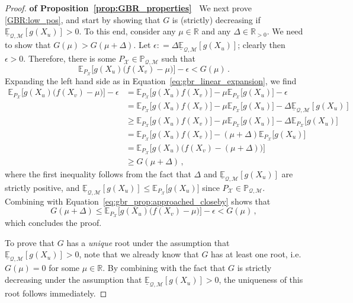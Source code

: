 \documentclass[twoside,11pt]{article}
\newcommand{\reals}{\mathbb{R}}
\newcommand{\realspos}{\reals_{>0}}
\newcommand{\states}{\mathcal{X}}
\newcommand{\lexp}{\underline{\mathbb{E}}_{\rateset,\mathcal{M}}}
\newcommand{\rateset}{\mathcal{Q}}
\newcommand{\coloneqq}{:\!=}
\begin{document}
\begin{proof}{\bf of Proposition~\ref{prop:GBR_properties}~}
We next prove \ref{GBR:low_pos}, and start by showing that $G$ is (strictly) decreasing if $\lexp[g(X_u)]>0$. To this end, consider any $\mu\in\reals$ and any $\Delta\in\realspos$. We need to show that $G(\mu)>G(\mu+\Delta)$. Let $\epsilon\coloneqq \Delta \lexp[g(X_u)]$; clearly then $\epsilon>0$. Therefore, there is some $P_\states\in\mathbb{P}_{\rateset,\mathcal{M}}$ such that
\begin{equation}\label{eq:gbr_prop:approached_closeby}
\mathbb{E}_{P_\states}\bigl[g(X_u)\bigl(f(X_v)-\mu\bigr)\bigr] - \epsilon < G(\mu)\,.
\end{equation}
Expanding the left hand side as in Equation~\eqref{eq:gbr_linear_expansion}, we find
\begin{align*}
\mathbb{E}_{P_\states}\bigl[g(X_u)\bigl(f(X_v)-\mu\bigr)\bigr] - \epsilon &= \mathbb{E}_{P_\states}\bigl[g(X_u)f(X_v)\bigr] - \mu \mathbb{E}_{P_\states}\bigl[g(X_u)\bigr] - \epsilon \\
 &= \mathbb{E}_{P_\states}\bigl[g(X_u)f(X_v)\bigr] - \mu \mathbb{E}_{P_\states}\bigl[g(X_u)\bigr] - \Delta\lexp[g(X_u)] \\
 &\geq \mathbb{E}_{P_\states}\bigl[g(X_u)f(X_v)\bigr] - \mu \mathbb{E}_{P_\states}\bigl[g(X_u)\bigr] - \Delta\mathbb{E}_{P_\states}\bigl[g(X_u)\bigr] \\
 &= \mathbb{E}_{P_\states}\bigl[g(X_u)f(X_v)\bigr] - (\mu+\Delta) \mathbb{E}_{P_\states}\bigl[g(X_u)\bigr] \\
 &= \mathbb{E}_{P_\states}\bigl[g(X_u)\bigl(f(X_v)-(\mu+\Delta)\bigr)\bigr] \\
 &\geq G(\mu+\Delta)\,,
\end{align*}
where the first inequality follows from the fact that $\Delta$ and $\lexp[g(X_u)]$ are strictly positive, and $\lexp[g(X_u)]\leq \mathbb{E}_{P_\states}\bigl[g(X_u)\bigr]$ since $P_\states\in\mathbb{P}_{\rateset,\mathcal{M}}$. Combining with Equation~\eqref{eq:gbr_prop:approached_closeby} shows that
\begin{equation*}
G(\mu+\Delta) \leq \mathbb{E}_{P_\states}\bigl[g(X_u)\bigl(f(X_v)-\mu\bigr)\bigr] - \epsilon < G(\mu)\,,
\end{equation*}
which concludes the proof.

To prove that $G$ has a \emph{unique} root under the assumption that $\lexp[g(X_u)]>0$, note that we already know that $G$ has at least one root, i.e. $G(\mu)=0$ for some $\mu\in\reals$. By combining with the fact that $G$ is strictly decreasing under the assumption that $\lexp[g(X_u)]>0$, the uniqueness of this root follows immediately.


\end{proof}
\end{document}
